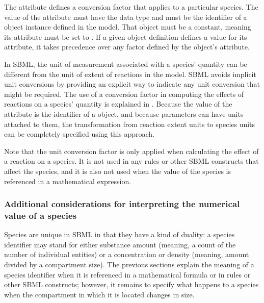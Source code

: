 The attribute  defines a conversion factor
that applies to a particular species.  The value of the attribute
must have the data type  and must be the
identifier of a \Parameter object instance defined in the model.
That \Parameter object must be a constant, meaning its
 attribute must be set to .  If a given
\Species object definition defines a value for its
 attribute, it takes precedence over any
factor defined by the \Model object's 
attribute.

In SBML, the unit of measurement associated with a species'
quantity can be different from the unit of extent of reactions in
the model.  SBML avoids implicit unit conversions by providing an
explicit way to indicate any unit conversion that might be
required.  The use of a conversion factor in computing the effects
of reactions on a species' quantity is explained in
.  Because the value of
the  attribute is the identifier of a
\Parameter object, and because parameters can have units attached
to them, the transformation from reaction extent units to species
units can be completely specified using this approach.

Note that the unit conversion factor is only applied when
calculating the effect of a reaction on a species.  It is not used
in any rules or other SBML constructs that affect the species, and
it is also not used when the value of the species is referenced in
a mathematical expression.


\subsubsection{Additional considerations for interpreting the
  numerical value of a species}
\label{sec:species-meaning}

Species are unique in SBML in that they have a kind of duality: a
species identifier may stand for either substance amount (meaning,
a count of the number of individual entities) or a concentration
or density (meaning, amount divided by a compartment size).  The
previous sections explain the meaning of a species identifier when
it is referenced in a mathematical formula or in rules or other
SBML constructs; however, it remains to specify what happens to a
species when the compartment in which it is located changes in
size.

